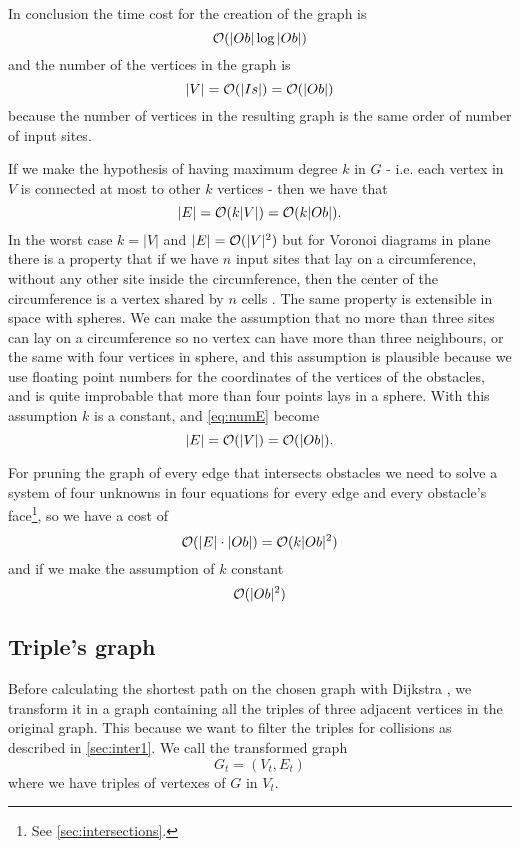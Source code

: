 \documentclass[dissertation.tex]{subfiles}
\begin{document}
In conclusion the time cost for the creation of the graph
is
\newcommand{\eqCostGraph}{\ensuremath{\bigO(|Ob|\log |Ob|)}}
\begin{equation}
  \label{eq:costGraph}
  \eqCostGraph
\end{equation}
and the number of the vertices in the graph
is 
\begin{equation}
  \label{eq:numV}
  |V|=\mathcal{O}(|Is|)=\mathcal{O}(|Ob|)
\end{equation}
because the number of vertices in the resulting graph is the
same order of number of input sites.

If we make the hypothesis of having maximum degree $k$ in $G$ -
i.e. each vertex in $V$ is connected at most to other $k$ vertices -
then we have that
\begin{equation}
  \label{eq:numE}
  |E|=\mathcal{O}(k|V|)=\mathcal{O}(k|Ob|).
\end{equation}
In the worst case $k=|V|$ and $|E|=\mathcal{O}(|V|^2)$ but for Voronoi
diagrams in plane there is a property that if we have $n$ input sites
that lay on a circumference, without any other site inside the
circumference, then the center of the circumference is a vertex shared
by $n$ cells \cite{deberg}. The same property is extensible in space with
spheres. We can make the assumption that no more than three sites can lay
on a circumference so no vertex can have more than three neighbours,
or the same with four vertices in sphere, and this assumption is
plausible because we use floating point numbers for the coordinates of
the vertices of the obstacles, and is quite improbable that more than
four points lays in a sphere. With this assumption $k$ is a constant,
and \cref{eq:numE} become
\begin{equation*}
  |E|=\mathcal{O}(|V|)=\mathcal{O}(|Ob|).
\end{equation*}

For pruning the graph of every edge that intersects obstacles we need
to solve a system of four unknowns in four equations for every edge
and every obstacle's face\footnote{See \cref{sec:intersections}.}, so
we have a cost of
\newcommand{\eqCostPruning}{\ensuremath{\bigO(k|Ob|^2)}}
\begin{equation}
  \label{eq:costPruning}
  \bigO(|E|\cdot|Ob|)=\eqCostPruning
\end{equation}
and if we make the assumption of $k$ constant
\begin{equation*}
  \mathcal{O}(|Ob|^2)
\end{equation*}

\subsection{Triple's graph}\label{sec:trigraph}
Before calculating the shortest path on the chosen graph with Dijkstra
\cite{dijkstra}\cite{knuth}, we
transform it in a graph containing all the triples
of three adjacent vertices in the original graph. This because we want
to filter the triples for collisions as described in
\cref{sec:inter1}. We call the transformed graph
$$G_t=(V_t,E_t)$$
where we have triples of vertexes of $G$ in $V_t$.
\end{document}
